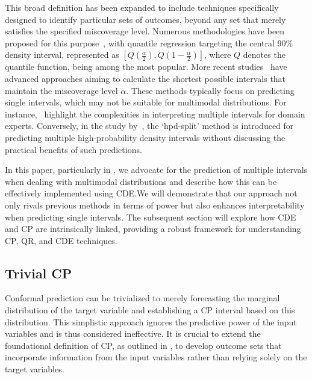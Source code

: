 This broad definition has been expanded to include techniques specifically designed to identify particular sets of outcomes, beyond any set that merely satisfies the specified miscoverage level. Numerous methodologies have been proposed for this purpose~\cite{sesia2021conformal, chernozhukov2021distributional, balasubramanian2014conformal, shafer2008tutorial}, with quantile regression targeting the central 90\% density interval, represented as $[Q(\frac{\alpha}{2}), Q(1-\frac{\alpha}{2})]$, where $Q$ denotes the quantile function, being among the most popular. More recent studies~\cite{sesia2021conformal, chernozhukov2021distributional} have advanced approaches aiming to calculate the shortest possible intervals that maintain the miscoverage level $\alpha$. These methods typically focus on predicting single intervals, which may not be suitable for multimodal distributions. For instance,~\cite{sesia2021conformal} highlight the complexities in interpreting multiple intervals for domain experts. Conversely, in the study by~\cite{izbicki2022cd}, the `hpd-split' method is introduced for predicting multiple high-probability density intervals without discussing the practical benefits of such predictions.

In this paper, particularly in , we advocate for the prediction of multiple intervals when dealing with multimodal distributions and describe how this can be effectively implemented using CDE.\@ We will demonstrate that our approach not only rivals previous methods in terms of power but also enhances interpretability when predicting single intervals. The subsequent section will explore how CDE and CP are intrinsically linked, providing a robust framework for understanding CP, QR, and CDE techniques.

\subsection{Trivial CP}\label{sec:trivial_cp}

Conformal prediction can be trivialized to merely forecasting the marginal distribution of the target variable and establishing a CP interval based on this distribution. This simplistic approach ignores the predictive power of the input variables and is thus considered ineffective. It is crucial to extend the foundational definition of CP, as outlined in , to develop outcome sets that incorporate information from the input variables rather than relying solely on the target variables.

